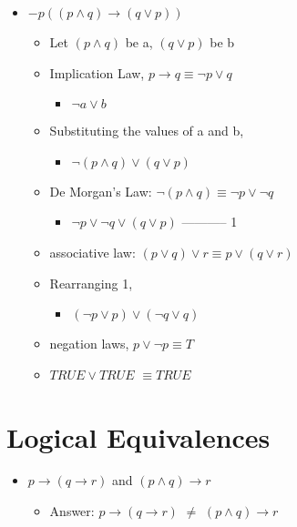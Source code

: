 \documentclass[11pt]{article}
\begin{document}
 \begin{itemize}
\item $-p((p \wedge  q) \to (q \vee p))$

 \begin{itemize}
 \item Let $(p \wedge q)$ be a, $(q \vee p)$ be b 
\item Implication Law, $ p \to q \equiv \neg p \vee q $
 \begin{itemize}
 \item $ \neg a \vee b $
 \end{itemize}
\item Substituting the values of a and b,
 \begin{itemize}
 \item $ \neg (p \wedge q) \vee ( q \vee p)$ 
 \end{itemize}
\item De Morgan's Law: $ \neg(p \wedge q) \equiv \neg p \vee  \neg q$ 
 \begin{itemize}
 \item $\neg p \vee \neg q \vee (q \vee p)$ ----------- 1
\end{itemize}
\item associative law: $(p \vee q) \vee r \equiv p \vee (q \vee r) $
\item Rearranging 1, 
 \begin{itemize}
 \item $(\neg p \vee p) \vee (\neg q \vee q)$
\end{itemize}
\item negation laws, $ p \vee \neg p \equiv T$
\item $TRUE \vee TRUE$ $ \equiv TRUE$
\end{itemize}
\end{itemize}


\section*{Logical Equivalences}


\begin{itemize}
\item $ p \to (q \to r)$ and $(p \wedge q) \to r $

 \begin{itemize}
\item Answer: $ p \to (q \to r)$ $ \ne  $ $(p \wedge q) \to r $

\vskip 0.1in

\vskip 0.1in



\end{itemize}

 \end{itemize} 
\end{document}
